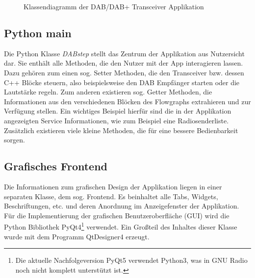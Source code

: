 \begin{figure}[b!]
\begin{center}
\end{center}
\caption{Klassendiagramm der DAB/DAB+ Transceiver Applikation}
\label{fig:class_diagramm}
\end{figure}

\subsection{Python main}
Die Python Klasse \glqq \textit{DABstep}\grqq{} stellt das Zentrum der Applikation aus Nutzersicht dar. Sie enthält alle Methoden, die den Nutzer mit der App interagieren lassen. Dazu gehören zum einen sog. Setter Methoden, die den Transceiver bzw. dessen C++ Blöcke steuern, also beispielsweise den DAB Empfänger starten oder die Lautstärke regeln. Zum anderen existieren sog. Getter Methoden, die Informationen aus den verschiedenen Blöcken des Flowgraphs extrahieren und zur Verfügung stellen. Ein wichtiges Beispiel hierfür sind die in der Applikation angezeigten Service Informationen, wie zum Beispiel eine Radiosenderliste. Zusätzlich existieren viele kleine Methoden, die für eine bessere Bedienbarkeit sorgen.

\subsection{Grafisches Frontend}
Die Informationen zum grafischen Design der Applikation liegen in einer separaten Klasse, dem sog. Frontend. Es beinhaltet alle Tabs, Widgets, Beschriftungen, etc. und deren Anordnung im Anzeigefenster der Applikation. Für die Implementierung der grafischen Benutzeroberfläche (GUI) wird die Python Bibliothek PyQt4\footnote{Die aktuelle Nachfolgeversion PyQt5 verwendet Python3, was in GNU Radio noch nicht komplett unterstützt ist.} verwendet. Ein Großteil des Inhaltes dieser Klasse wurde mit dem Programm QtDesigner4 erzeugt.

